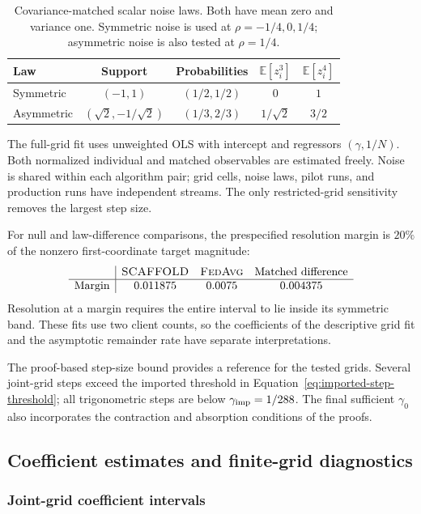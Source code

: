 \begin{table}[tbp]
\centering\small
\caption{Covariance-matched scalar noise laws. Both have mean zero and
variance one. Symmetric noise is used at $\rho=-1/4,0,1/4$; asymmetric
noise is also tested at $\rho=1/4$.}
\label{tab:num-noise-laws}
\begin{tabular}{@{}lcccc@{}}
\toprule
Law & Support & Probabilities & $\mathbb E[z_i^3]$ & $\mathbb E[z_i^4]$ \\
\midrule
Symmetric & $(-1,1)$ & $(1/2,1/2)$ & $0$ & $1$ \\
Asymmetric & $(\sqrt2,-1/\sqrt2)$ & $(1/3,2/3)$ & $1/\sqrt2$ & $3/2$ \\
\bottomrule
\end{tabular}
\end{table}

The full-grid fit uses unweighted OLS with intercept and regressors
$(\gamma,1/N)$. Both normalized individual and matched observables are
estimated freely. Noise is shared within each algorithm pair; grid cells,
noise laws, pilot runs, and production runs have independent streams.
The only restricted-grid sensitivity removes the largest step size.

For null and law-difference comparisons, the prespecified resolution
margin is $20\%$ of the nonzero first-coordinate target magnitude:
\[
\begin{array}{c|ccc}
 & \textnormal{\textsc{SCAFFOLD}}{} & \textnormal{\textsc{FedAvg}}{} & \text{Matched difference}\\ \hline
\text{Margin} & 0.011875 & 0.0075 & 0.004375
\end{array}
\]
Resolution at a margin requires the entire interval to lie inside its
symmetric band. These fits use two client counts, so the coefficients of
the descriptive grid fit and the asymptotic remainder rate have separate
interpretations.

The proof-based step-size bound provides a reference for the tested grids.
Several joint-grid steps exceed the imported threshold in
Equation~\eqref{eq:imported-step-threshold}; all trigonometric steps are
below $\gamma_{\rm imp}=1/288$. The final sufficient $\gamma_0$ also
incorporates the contraction and absorption conditions of the proofs.

\subsection{Coefficient estimates and finite-grid diagnostics}
\label{app:num-coefficient-results}

\subsubsection{Joint-grid coefficient intervals}
\label{app:num-coefficients}


